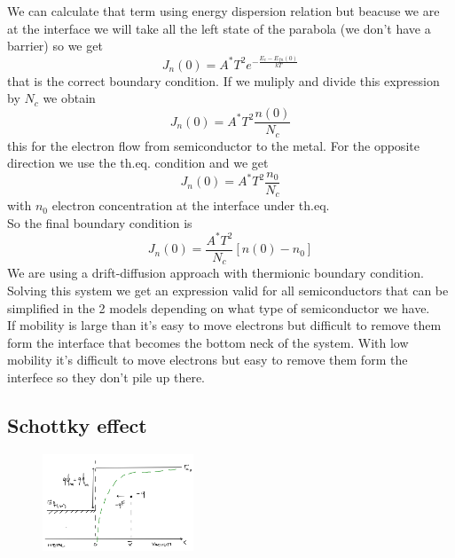 We can calculate that term using energy dispersion relation but beacuse we are at the interface we will take all the left state of the parabola (we don't have a barrier) so we get 
\begin{equation}
J_n(0)=A^*T^2e^{-\frac{E_c-E_{fn}(0)}{kT}} 
\end{equation}
that is the correct boundary condition. If we muliply and divide this expression by $N_c$ we obtain
\begin{equation}
J_n(0)=A^*T^2 \frac{n(0)}{N_c}
\end{equation}
this for the electron flow from semiconductor to the metal. For the opposite direction we use the th.eq. condition and we get
\begin{equation}
J_n(0)=A^*T^2 \frac{n_0}{N_c}
\end{equation}
with $n_0$ electron concentration at the interface under th.eq.\\
So the final boundary condition is
\begin{equation}
J_n(0)=\frac{A^*T^2 }{N_c}[n(0)-n_0]
\end{equation}
We are using a drift-diffusion approach with thermionic boundary condition.\\
Solving this system we get an expression valid for all semiconductors that can be simplified in the 2 models depending on what type of semiconductor we have.\\
If mobility is large than it's easy to move electrons but difficult to remove them form the interface that becomes the bottom neck of the system. With low mobility it's difficult to move electrons but easy to remove them form the interfece so they don't pile up there.\\

\subsection{Schottky effect}

\begin{figure}
\includegraphics[width=0.4\textwidth]{scheff.png}
\end{figure}

